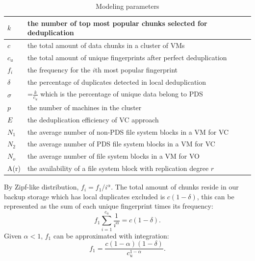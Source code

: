 \begin{table}[htbp]
\centering
\begin{tabular}{|p{1.25cm}|p{5.5cm}|}
\hline
$k$ &  the number of top most popular chunks selected for deduplication\\ 
\hline
$c$ &  the total amount of data chunks in a cluster of VMs\\ 
\hline
$c_u$ &  the total amount of unique fingerprints after perfect  deduplication\\
\hline
$f_i$ &  the frequency for the $i$th most popular fingerprint\\
\hline
$\delta$ &  the percentage of duplicates detected in local deduplication\\
\hline
$\sigma$ & =$\frac{k}{c_u}$ which is  the percentage of unique data  belong to  PDS\\
\hline
$p$ & the number of machines in the cluster\\
\hline
$E$ & the deduplication efficiency of VC approach\\
\hline
$N_1$ & the average number  of non-PDS file system blocks  in a VM for VC\\
\hline
$N_2$ & the average number  of PDS file system blocks  in a VM for VC\\
\hline
$N_o$ & the average number  of file system blocks  in a VM for VO\\
\hline
A(r) & the availability of a file system block with replication degree $r$\\
\hline
\end{tabular}
\caption{Modeling  parameters}
\label{tab:symbol}
\end{table}


By Zipf-like distribution, $f_i = {f_1}/{i^\alpha}.$
The total amount of chunks reside in our backup storage which
has local duplicates excluded is $c (1-\delta)$, this can be represented
as the sum of each unique fingerprint times its frequency:
\[
f_1 \sum_{i=1}^{c_u}\frac{1}{i^\alpha} = c (1-\delta).
\]
Given $\alpha <1$, $f_1$ can be approximated with integration:
\begin{equation}
f_1=\frac{c(1-\alpha)(1-\delta)}{c_u^{1-\alpha}}.
\end{equation}

